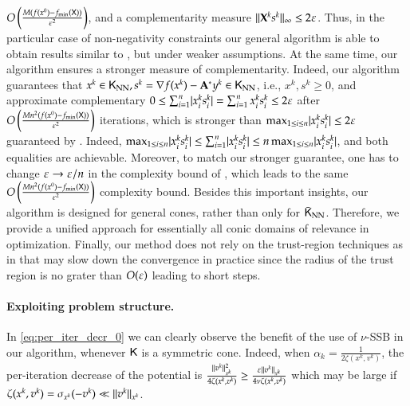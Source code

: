 $O\left(\frac{M  (f(x^{0}) - f_{\min}(\mathsf{X}))}{\varepsilon^2}\right)$, and a complementarity measure $\lVert\mathbf{X}^{k}s^{k}\rVert_{\infty}\leq 2\varepsilon$. %
%
Thus, in the particular case of non-negativity constraints our general algorithm is able to obtain results similar to \cite{HaeLiuYe18}, but under weaker assumptions. At the same time, our algorithm ensures a stronger measure of complementarity. Indeed, our algorithm guarantees that $x^{k}\in\mathsf{K}_{\text{NN}},s^{k}=\nabla f(x^k) -{\mathbf A}^{\ast}y^{k}\in\mathsf{K}_{\text{NN}}$, i.e., $x^{k},s^{k}\geq 0$, and approximate complementary $0\leq \sum_{i=1}^{n}\lvert x_{i}^{k}s_{i}^{k}\rvert=\sum_{i=1}^{n}x_{i}^{k}s_{i}^{k}\leq 2\varepsilon$ after $O\left(\frac{M n^2(f(x^{0}) - f_{\min}(\mathsf{X}))}{\varepsilon^2}\right)$ iterations, which is stronger than $\max_{1\leq i\leq n}\lvert x_{i}^{k}s_{i}^{k}\rvert \leq 2\varepsilon$ guaranteed by \cite{HaeLiuYe18}. Indeed, $\max_{1\leq i\leq n}\lvert x_{i}^{k}s_{i}^{k}\rvert \leq \sum_{i=1}^{n}\lvert x_{i}^{k}s_{i}^{k}\rvert \leq n \max_{1\leq i\leq n}\lvert x_{i}^{k}s_{i}^{k}\rvert$, and both equalities are achievable. Moreover,  to match our stronger guarantee, one has to change $\varepsilon \to\varepsilon/n$ in the complexity bound of \cite{HaeLiuYe18}, which leads to the same $O\left(\frac{M n^2(f(x^{0}) - f_{\min}(\mathsf{X}))}{\varepsilon^2}\right)$ complexity bound. Besides this important insights, our algorithm is designed for general cones, rather than only for $\bar{\mathsf{K}}_{\text{NN}}$. Therefore, we provide a unified approach for essentially all conic domains of relevance in optimization. Finally, our method does not rely on the trust-region techniques as in \cite{HaeLiuYe18} that may slow down the convergence in practice since the radius of the trust region is no grater than $O(\varepsilon)$ leading to short steps.

\paragraph{Exploiting problem structure.}
In \eqref{eq:per_iter_decr_0} we can clearly observe the benefit of the use of $\nu$-SSB in our algorithm, whenever $\mathsf{K}$ is a symmetric cone. Indeed, when $\alpha_k=\frac{1}{2\zeta(x^k,v^k)}$, the per-iteration decrease of the potential is $\frac{\lVert v^{k}\rVert_{x^{k}}^{2} }{4\zeta(x^k,v^k)} \geq \frac{ \varepsilon \lVert v^{k}\rVert_{x^{k}}}{4\nu\zeta(x^k,v^k)} $ which may be large if $\zeta(x^k,v^k)=\sigma_{x^k}(-v^k) \ll \lVert v^{k}\rVert_{x^{k}}$.


